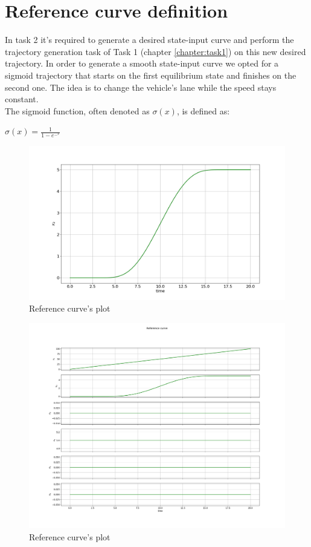 \documentclass[a4paper,11pt,oneside]{book}
\begin{document}
\section{Reference curve definition}
In task 2 it's required to generate a desired state-input curve and perform the trajectory generation task of Task 1 (chapter \ref{chapter:task1}) on this new desired trajectory.
In order to generate a smooth state-input curve we opted for a sigmoid trajectory that starts on the first equilibrium state and finishes on the second one. The idea is to change the vehicle's lane while the speed stays constant.\\
The sigmoid function, often denoted as $\sigma(x)$, is defined as:\\
\begin{center}
$\sigma(x)= \frac{1}{1-e^-^x}$\\  
\end{center}
\begin{figure}[h]
    \centering
    \includegraphics[scale=.27]{figs/Task2/ref_x2}
    \caption{Reference curve's plot}
    \label{fig:enter-label}
\end{figure}

\begin{figure}[h]
    \centering
    \includegraphics[scale=.3]{figs/Task2/ref_curve.png}
    \caption{Reference curve's plot}
    \label{fig:enter-label}
\end{figure}
\newpage
\end{document}

